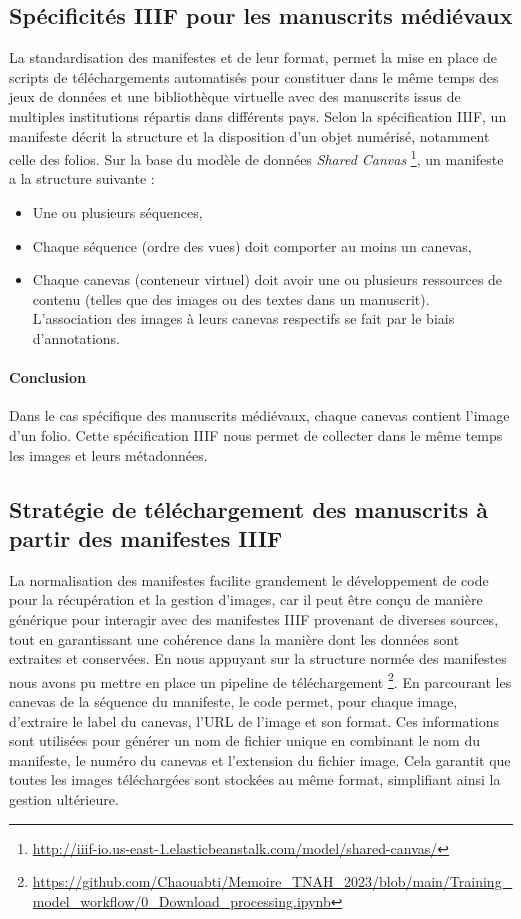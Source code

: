 \documentclass[12pt,twoside]{book}
\begin{document}
\subsection{Spécificités IIIF pour les manuscrits médiévaux}

La standardisation des manifestes et de leur format, permet la mise en place de scripts de téléchargements automatisés pour constituer dans le même temps des jeux de données et une bibliothèque virtuelle avec des manuscrits issus de multiples institutions répartis dans différents pays. 
Selon la spécification IIIF, un manifeste décrit la structure et la disposition d'un objet numérisé, notamment celle des folios. Sur la base du modèle de données \textit{Shared Canvas} \footnote{\url{http://iiif-io.us-east-1.elasticbeanstalk.com/model/shared-canvas/}}, un manifeste a la structure suivante : \\
\begin{itemize}
    \item Une ou plusieurs séquences,
    \item Chaque séquence (ordre des vues) doit comporter au moins un canevas,
    \item Chaque canevas (conteneur virtuel) doit avoir une ou plusieurs ressources de contenu (telles que des images ou des textes dans un manuscrit). L'association des images à leurs canevas respectifs se fait par le biais d'annotations. 
\end{itemize}

\paragraph{Conclusion}Dans le cas spécifique des manuscrits médiévaux, chaque canevas contient l’image d’un folio. Cette spécification IIIF  nous permet de collecter dans le même temps les images et leurs métadonnées.

\subsection{Stratégie de téléchargement des manuscrits à partir des manifestes IIIF}

La normalisation des manifestes facilite grandement le développement de code pour la récupération et la gestion d'images, car il peut être conçu de manière générique pour interagir avec des manifestes IIIF provenant de diverses sources, tout en garantissant une cohérence dans la manière dont les données sont extraites et conservées. En nous appuyant sur la structure normée des manifestes nous avons pu mettre en place un pipeline de téléchargement \footnote{\url{https://github.com/Chaouabti/Memoire_TNAH_2023/blob/main/Training\_model\_workflow/0\_Download\_processing.ipynb}}. En parcourant les canevas de la séquence du manifeste, le code permet, pour chaque image, d’extraire le label du canevas, l'URL de l'image et son format. Ces informations sont utilisées pour générer un nom de fichier unique en combinant le nom du manifeste, le numéro du canevas et l'extension du fichier image. Cela garantit que toutes les images téléchargées sont stockées au même format, simplifiant ainsi la gestion ultérieure.
\end{document}
